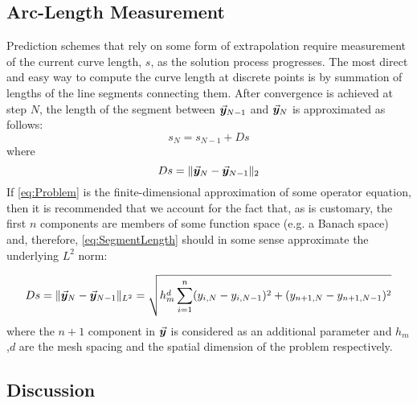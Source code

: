 \subsection{Arc-Length Measurement}
Prediction schemes that rely on some form of extrapolation require measurement 
of the current curve length, $s$, as the solution 
process progresses. The most direct and easy way
to compute the curve length at discrete points is by summation of lengths  
of the line segments connecting them. After convergence is achieved at step $N$,
the length of the segment between $\vec{\bm{y}}_{N-1}$ and $\vec{\bm{y}}_N$ is 
approximated as follows:
\begin{equation}
	s_N=s_{N-1}+Ds
	\label{eq:newS}
\end{equation}
where
\begin{equation}
	Ds = \Vert \vec{\bm{y}}_N-\vec{\bm{y}}_{N-1}\Vert_2
	\label{eq:SegmentLength}
\end{equation}
If \ref{eq:Problem} is the finite-dimensional approximation of some operator
equation, then it is recommended\cite{Keller87} that we account for the fact
that, as is customary, the first $n$ components are members of some function
space (e.g. a Banach space) and, therefore, \ref{eq:SegmentLength} should in 
some sense approximate the underlying $L^2$ norm:

\begin{equation}
	Ds = \Vert 
	\vec{\bm{y}}_N-\vec{\bm{y}}_{N-1}\Vert_{L^2}=\sqrt{h_m^d\sum_{i=1}^n(y_{i,N}-y_{i,N-1})^2+(y_{n+1,N}-y_{n+1,N-1})^2}
	\label{eq:INCR}
\end{equation}
where the $n+1$ component in $\vec{\bm{y}}$ is considered as an additional 
parameter and
$h_m$,$d$ are the mesh spacing and the spatial dimension of the problem 
respectively.


\subsection{Discussion}\label{CH5-S3SS2}

